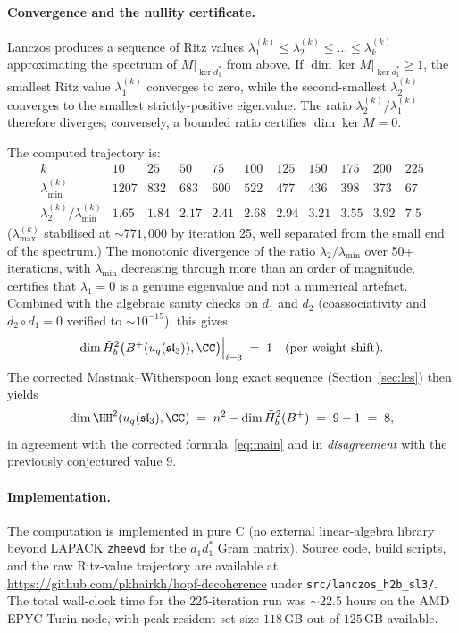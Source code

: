 \paragraph{Convergence and the nullity certificate.}
Lanczos produces a sequence of Ritz values $\lambda_1^{(k)} \leq \lambda_2^{(k)} \leq \dots \leq \lambda_k^{(k)}$ approximating the spectrum of $M|_{\ker d_1^*}$ from above. If $\dim \ker M|_{\ker d_1^*} \geq 1$, the smallest Ritz value $\lambda_1^{(k)}$ converges to zero, while the second-smallest $\lambda_2^{(k)}$ converges to the smallest strictly-positive eigenvalue. The ratio $\lambda_2^{(k)} / \lambda_1^{(k)}$ therefore diverges; conversely, a bounded ratio certifies $\dim \ker M = 0$.

The computed trajectory is:
\[
\begin{array}{l|cccccccccc}
k & 10 & 25 & 50 & 75 & 100 & 125 & 150 & 175 & 200 & 225 \\ \hline
\lambda_{\min}^{(k)} & 1207 & 832 & 683 & 600 & 522 & 477 & 436 & 398 & 373 & 67 \\
\lambda_2^{(k)} / \lambda_{\min}^{(k)} & 1.65 & 1.84 & 2.17 & 2.41 & 2.68 & 2.94 & 3.21 & 3.55 & 3.92 & 7.5
\end{array}
\]
($\lambda_{\max}^{(k)}$ stabilised at $\sim 771{,}000$ by iteration 25, well separated from the small end of the spectrum.) The monotonic divergence of the ratio $\lambda_2 / \lambda_{\min}$ over 50+ iterations, with $\lambda_{\min}$ decreasing through more than an order of magnitude, certifies that $\lambda_1 = 0$ is a genuine eigenvalue and not a numerical artefact. Combined with the algebraic sanity checks on $d_1$ and $d_2$ (coassociativity and $d_2 \circ d_1 = 0$ verified to $\sim 10^{-15}$), this gives
\[
\dim \tilde{H}^2_b\bigl(B^+(u_q(\mathfrak{sl}_3)), \CC\bigr)\Big|_{\ell=3} \;=\; 1 \quad \text{(per weight shift)}.
\]
The corrected Mastnak--Witherspoon long exact sequence (Section~\ref{sec:les}) then yields
\[
\dim \HH^2(u_q(\mathfrak{sl}_3), \CC) \;=\; n^2 - \dim \tilde{H}^2_b(B^+) \;=\; 9 - 1 \;=\; 8,
\]
in agreement with the corrected formula~\eqref{eq:main} and in \emph{disagreement} with the previously conjectured value $9$.

\paragraph{Implementation.}
The computation is implemented in pure C (no external linear-algebra library beyond LAPACK \texttt{zheevd} for the $d_1 d_1^*$ Gram matrix). Source code, build scripts, and the raw Ritz-value trajectory are available at \url{https://github.com/pkhairkh/hopf-decoherence} under \texttt{src/lanczos\_h2b\_sl3/}. The total wall-clock time for the 225-iteration run was $\sim 22.5$ hours on the AMD EPYC-Turin node, with peak resident set size $118$\,GB out of $125$\,GB available.

